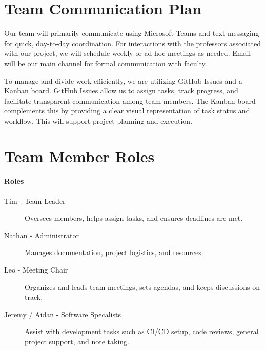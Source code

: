 \documentclass{article}
\begin{document}
\section{Team Communication Plan}

Our team will primarily communicate using Microsoft Teams and text messaging for quick, day-to-day coordination. For interactions with the professors associated with our project, we will schedule weekly or ad hoc meetings as needed. Email will be our main channel for formal communication with faculty.

To manage and divide work efficiently, we are utilizing GitHub Issues and a Kanban board. GitHub Issues allow us to assign tasks, track progress, and facilitate transparent communication among team members. The Kanban board complements this by providing a clear visual representation of task status and workflow. This will support project planning and execution.


\section{Team Member Roles}

\paragraph{Roles} 

\begin{description}
    \item[Tim - Team Leader] Oversees members, helps assign tasks, and ensures deadlines are met.
    \item[Nathan - Administrator] Manages documentation, project logistics, and resources.
    \item[Leo - Meeting Chair] Organizes and leads team meetings, sets agendas, and keeps discussions on track.
    \item[Jeremy / Aidan - Software Specalists] Assist with development tasks such as CI/CD setup, code reviews, general project support, and note taking.
\end{description}


\end{document}
